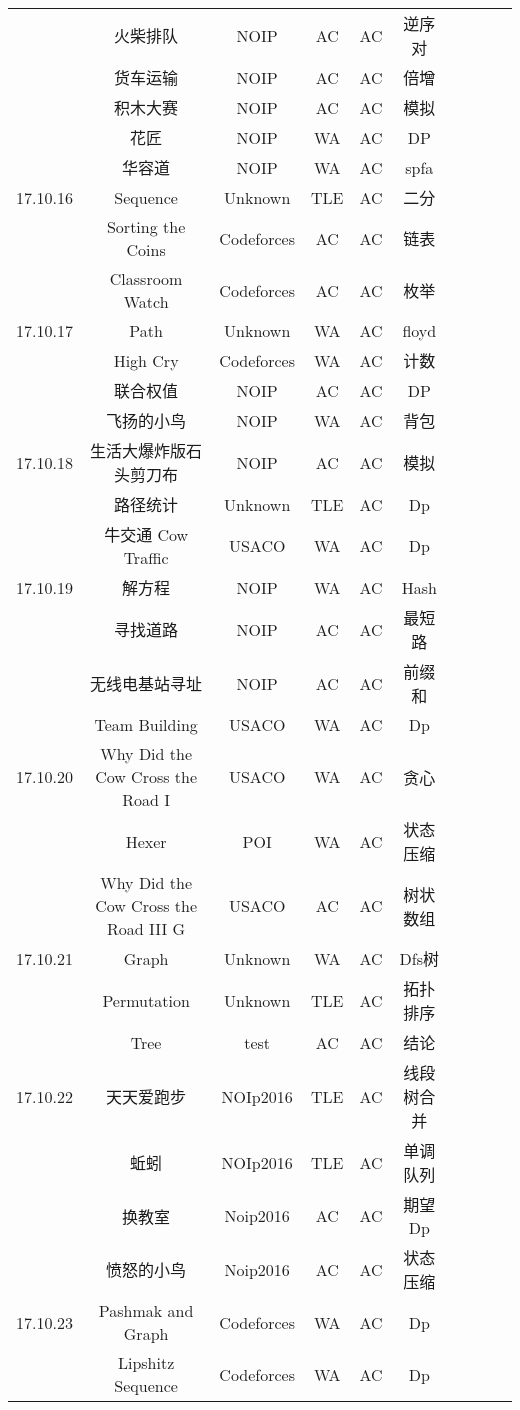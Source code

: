 \documentclass[landscape]{article}
\begin{document}
\begin{longtable}{cccccccccc}
  &火柴排队& NOIP &AC& AC &逆序对\\
  &货车运输& NOIP &AC& AC &倍增\\
  &积木大赛 &NOIP &AC &AC &模拟\\
  &花匠 &NOIP &WA &AC& DP\\
  &华容道 &NOIP &WA &AC& spfa\\
  \hline
  17.10.16 &Sequence& Unknown &TLE& AC& 二分\\
  &Sorting the Coins& Codeforces &AC &AC &链表\\
  &Classroom Watch &Codeforces& AC& AC& 枚举\\
  \hline
  17.10.17 &Path &Unknown &WA &AC &floyd\\
  &High Cry &Codeforces &WA &AC& 计数\\
  &联合权值 &NOIP& AC& AC& DP\\
  &飞扬的小鸟 &NOIP& WA& AC& 背包\\
  \hline
  17.10.18 &生活大爆炸版石头剪刀布& NOIP &AC& AC &模拟\\
  &路径统计& Unknown &TLE &AC &Dp\\
  &牛交通 Cow Traffic& USACO& WA& AC& Dp\\
  \hline
  17.10.19 &解方程 &NOIP &WA &AC &Hash\\
  &寻找道路 &NOIP& AC &AC &最短路\\
  &无线电基站寻址 &NOIP& AC& AC& 前缀和\\
  &Team Building& USACO &WA& AC &Dp\\
  \hline
  17.10.20 &Why Did the Cow Cross the Road I & USACO &WA &AC &贪心\\
  &Hexer &POI &WA &AC &状态压缩\\
  &Why Did the Cow Cross the Road III G& USACO &AC &AC &树状数组\\
  \hline
  17.10.21 &Graph &Unknown& WA& AC& Dfs树\\
  &Permutation& Unknown &TLE &AC &拓扑排序\\
  &Tree &test &AC &AC& 结论\\
  \hline
  17.10.22 &天天爱跑步& NOIp2016& TLE& AC& 线段树合并\\
  &蚯蚓 &NOIp2016 &TLE &AC &单调队列\\
  &换教室& Noip2016& AC& AC& 期望 Dp\\
  &愤怒的小鸟& Noip2016 &AC &AC &状态压缩\\
  \hline
  17.10.23 &Pashmak and Graph &Codeforces &WA &AC& Dp\\
  &Lipshitz Sequence &Codeforces &WA& AC& Dp\\

\end{longtable}
\end{document}
